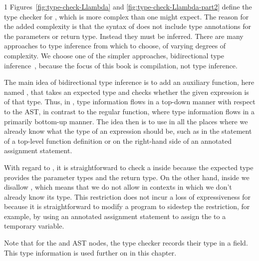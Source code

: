 \documentclass[7x10]{TimesAPriori_MIT}%
\def\pythonEd{1}
\providecommand{\BookEdition}{1}
\let\edition\BookEdition
\newcommand{\pythonColor}[0]{}
\numberwithin{theorem}{chapter}
\numberwithin{definition}{chapter}
\numberwithin{equation}{chapter}
\begin{document}
{\if\edition\pythonEd\pythonColor
%
Figures~\ref{fig:type-check-Llambda} and
\ref{fig:type-check-Llambda-part2} define the type checker for
\LangLam{}, which is more complex than one might expect. The reason
for the added complexity is that the syntax of  does not
include type annotations for the parameters or return type.  Instead
they must be inferred. There are many approaches to type inference
from which to choose, of varying degrees of complexity. We choose one
of the simpler approaches, bidirectional type
inference~\citep{Pierce:2000,Dunfield:2021}, because the focus of this
book is compilation, not type inference.

The main idea of bidirectional type inference is to add an auxiliary
function, here named , that takes an expected type
and checks whether the given expression is of that type.  Thus, in
, type information flows in a top-down manner with
respect to the AST, in contrast to the regular 
function, where type information flows in a primarily bottom-up
manner.
%
The idea then is to use  in all the places where we
already know what the type of an expression should be, such as in the
 statement of a top-level function definition or on the
right-hand side of an annotated assignment statement.

With regard to , it is straightforward to check a
 inside  because the expected type
provides the parameter types and the return type.  On the other hand,
inside  we disallow , which means
that we do not allow  in contexts in which we don't already
know its type. This restriction does not incur a loss of
expressiveness for \LangLam{} because it is straightforward to modify
a program to sidestep the restriction, for example, by using an
annotated assignment statement to assign the  to a
temporary variable.

Note that for the  and  AST nodes, the type
checker records their type in a  field. This type
information is used further on in this chapter.
%
\fi}
\end{document}
